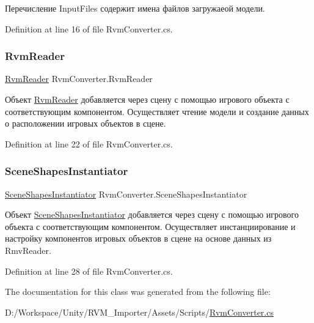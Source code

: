 Перечисление Input\+Files содержит имена файлов загружаеой модели. 



Definition at line 16 of file Rvm\+Converter.\+cs.

\mbox{\label{class_rvm_converter_ac6c385f8b740331cd879b3ef11686355}} 
\subsubsection{\texorpdfstring{RvmReader}{RvmReader}}
{\footnotesize\ttfamily \mbox{\hyperlink{class_rvm_reader}{Rvm\+Reader}} Rvm\+Converter.\+Rvm\+Reader}



Объект \mbox{\hyperlink{class_rvm_reader}{Rvm\+Reader}} добавляется через сцену с помощью игрового объекта с соответствующим компонентом. Осуществляет чтение модели и создание данных о расположении игровых объектов в сцене. 



Definition at line 22 of file Rvm\+Converter.\+cs.

\mbox{\label{class_rvm_converter_a88453bf28e3da9ffc41f40bb23460608}} 
\subsubsection{\texorpdfstring{SceneShapesInstantiator}{SceneShapesInstantiator}}
{\footnotesize\ttfamily \mbox{\hyperlink{class_scene_shapes_instantiator}{Scene\+Shapes\+Instantiator}} Rvm\+Converter.\+Scene\+Shapes\+Instantiator}



Объект \mbox{\hyperlink{class_scene_shapes_instantiator}{Scene\+Shapes\+Instantiator}} добавляется через сцену с помощью игрового объекта с соответствующим компонентом. Осуществляет инстанциирование и настройку компонентов игровых объектов в сцене на основе данных из Rmv\+Reader. 



Definition at line 28 of file Rvm\+Converter.\+cs.



The documentation for this class was generated from the following file\+:\begin{DoxyCompactItemize}
\item 
D\+:/\+Workspace/\+Unity/\+R\+V\+M\+\_\+\+Importer/\+Assets/\+Scripts/\mbox{\hyperlink{_rvm_converter_8cs}{Rvm\+Converter.\+cs}}\end{DoxyCompactItemize}
